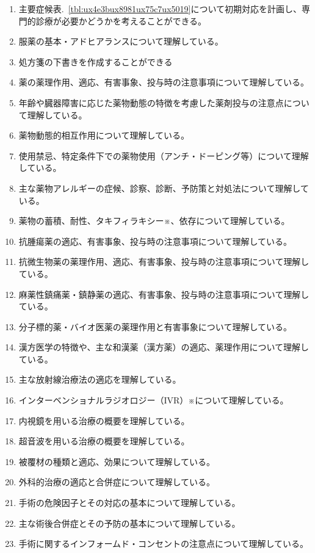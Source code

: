 \documentclass[
]{ltjsarticle}
\providecommand{\tightlist}{%
  \setlength{\itemsep}{0pt}\setlength{\parskip}{0pt}}
\begin{document}
\begin{enumerate}
\def\labelenumi{\arabic{enumi}.}
\tightlist
\item
  主要症候表.~\ref{tbl:ux4e3bux8981ux75c7ux5019}について初期対応を計画し、専門的診療が必要かどうかを考えることができる。
\item
  服薬の基本・アドヒアランスについて理解している。
\item
  処方箋の下書きを作成することができる
\item
  薬の薬理作用、適応、有害事象、投与時の注意事項について理解している。
\item
  年齢や臓器障害に応じた薬物動態の特徴を考慮した薬剤投与の注意点について理解している。
\item
  薬物動態的相互作用について理解している。
\item
  使用禁忌、特定条件下での薬物使用（アンチ・ドーピング等）について理解している。
\item
  主な薬物アレルギーの症候、診察、診断、予防策と対処法について理解している。
\item
  薬物の蓄積、耐性、タキフィラキシー※、依存について理解している。
\item
  抗腫瘍薬の適応、有害事象、投与時の注意事項について理解している。
\item
  抗微生物薬の薬理作用、適応、有害事象、投与時の注意事項について理解している。
\item
  麻薬性鎮痛薬・鎮静薬の適応、有害事象、投与時の注意事項について理解している。
\item
  分子標的薬・バイオ医薬の薬理作用と有害事象について理解している。
\item
  漢方医学の特徴や、主な和漢薬（漢方薬）の適応、薬理作用について理解している。
\item
  主な放射線治療法の適応を理解している。
\item
  インターベンショナルラジオロジー（IVR）※について理解している。
\item
  内視鏡を用いる治療の概要を理解している。
\item
  超音波を用いる治療の概要を理解している。
\item
  被覆材の種類と適応、効果について理解している。
\item
  外科的治療の適応と合併症について理解している。
\item
  手術の危険因子とその対応の基本について理解している。
\item
  主な術後合併症とその予防の基本について理解している。
\item
  手術に関するインフォームド・コンセントの注意点について理解している。

\end{enumerate}
\end{document}
